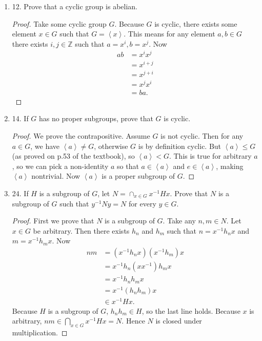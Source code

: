 \begin{enumerate}[resume]
\begin{proof}[Solution]
By Lagrange's Theorem, there's no other proper subgroup with higher order, since $4$ and $5$ do not divide $6$. The last subgroup would be order $6$, which is $S_3$ itself.
\end{proof}
\item 12. Prove that a cyclic group is abelian.
\begin{proof}
Take some cyclic group $G$. Because $G$ is cyclic, there exists some element $x \in G$ such that $G = \left\langle x \right\rangle $. This means for any element $a,b \in G$ there exists $i, j \in \mathbb{Z}$ such that $a = x^i, b = x^j$. Now
\begin{align*}
	ab &= x^i x^j \\
	&= x^{i+j} \\
	&= x^{j+i} \\
	&= x^j x^i \\
	&= ba 
.\end{align*}
\end{proof}

\item 14. If $G$ has no proper subgroups, prove that $G$ is cyclic.
\begin{proof}
We prove the contrapositive. Assume $G$ is not cyclic. Then for any $a \in G$, we have $\left\langle a \right\rangle \neq G$, otherwise $G$ is by definition cyclic. But $\left\langle a \right\rangle \le G$ (as proved on p.53 of the textbook), so $\left\langle a \right\rangle <G$. This is true for arbitrary $a$, so we can pick a non-identity $a$ so that $a \in \left\langle a \right\rangle $ and $e \in \left\langle a \right\rangle $, making $\left\langle a \right\rangle $ nontrivial. Now $\left\langle a \right\rangle $ is a proper subgroup of $G$.
\end{proof}

\item 24. If $H$ is a subgroup of $G$, let $N=\cap_{x \in G} x^{-1} H x$. Prove that $N$ is a subgroup of $G$ such that $y^{-1} N y=N$ for every $y \in G$.
\begin{proof}
First we prove that $N$ is a subgroup of $G$. Take any $n, m \in N$. Let $x \in G$ be arbitrary. Then there exists $h_{n}$ and $h_{m}$ such that $n = x^{-1} h_n x$ and $m = x^{-1} h_m x$. Now
\begin{align*}
	nm &= (x^{-1}  h_n x) (x^{-1}  h_m) x \\
	&= x^{-1} h_n (x x^{-1} ) h_m x \\
	&= x^{-1} h_n h_m x \\
	&= x^{-1} (h_n h_m) x\\
	&\in x^{-1} H x
.\end{align*}
Because $H$ is a subgroup of $G$, $h_n h_m \in H$, so the last line holds. Because $x$ is arbitrary, $nm \in \bigcap_{x \in G} x^{-1} H x = N$. Hence $N$ is closed under multiplication.


\end{proof}
\end{enumerate}
